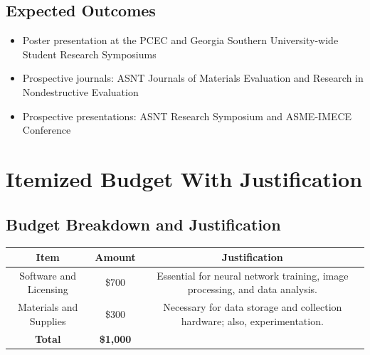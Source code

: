 \documentclass[pra, superscriptaddress]{revtex4-2}
\begin{document}
\subsection{Expected Outcomes}
\begin{itemize}
\item Poster presentation at the PCEC and Georgia Southern University-wide Student Research Symposiums
\item Prospective journals: ASNT Journals of Materials Evaluation and Research in Nondestructive Evaluation
\item Prospective presentations: ASNT Research Symposium and ASME-IMECE Conference
\end{itemize}
\newpage

\section{Itemized Budget With Justification}
\subsection{Budget Breakdown and Justification}
\begin{table}[htbp]
    \centering
    \begin{tabular}{|c|c|c|}
    \hline
    \textbf{Item} & \textbf{Amount} & \textbf{Justification} \\ \hline
    Software and Licensing & \$700 & Essential for neural network training, image processing, and data analysis. \\ \hline
    Materials and Supplies & \$300 & Necessary for data storage and collection hardware; also, experimentation. \\ \hline
    \textbf{Total} & \textbf{\$1,000} \\ \cline{1-2}
    \end{tabular}
\end{table}

\end{document}

